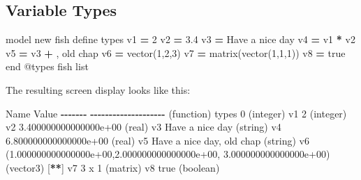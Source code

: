 \documentclass[a4paper, nobind]{templates/ociamthesis}
\newenvironment{Shaded}{\begin{snugshade}}{\end{snugshade}}
\newcommand{\AttributeTok}[1]{\textcolor[rgb]{0.77,0.63,0.00}{#1}}
\newcommand{\BuiltInTok}[1]{#1}
\newcommand{\DecValTok}[1]{\textcolor[rgb]{0.00,0.00,0.81}{#1}}
\newcommand{\FloatTok}[1]{\textcolor[rgb]{0.00,0.00,0.81}{#1}}
\newcommand{\NormalTok}[1]{#1}
\newcommand{\OperatorTok}[1]{\textcolor[rgb]{0.81,0.36,0.00}{\textbf{#1}}}
\newcommand{\StringTok}[1]{\textcolor[rgb]{0.31,0.60,0.02}{#1}}
\renewenvironment{Shaded}
{
  \vspace{10pt}%
  \begin{snugshade}%
}{%
  \end{snugshade}%
  \vspace{8pt}%
}
\begin{document}
\hypertarget{variable-types}{%
\subsection{Variable Types}\label{variable-types}}

\begin{Shaded}
\begin{Highlighting}[]
\NormalTok{model new}
\NormalTok{fish define types}
\NormalTok{    v1 }\OperatorTok{=} \DecValTok{2}
\NormalTok{    v2 }\OperatorTok{=} \FloatTok{3.4}
\NormalTok{    v3 }\OperatorTok{=} \StringTok{\textquotesingle{}Have a nice day\textquotesingle{}}
\NormalTok{    v4 }\OperatorTok{=}\NormalTok{ v1 }\OperatorTok{*}\NormalTok{ v2}
\NormalTok{    v5 }\OperatorTok{=}\NormalTok{ v3 }\OperatorTok{+} \StringTok{\textquotesingle{}, old chap\textquotesingle{}}
\NormalTok{    v6 }\OperatorTok{=}\NormalTok{ vector(}\DecValTok{1}\NormalTok{,}\DecValTok{2}\NormalTok{,}\DecValTok{3}\NormalTok{)}
\NormalTok{    v7 }\OperatorTok{=}\NormalTok{ matrix(vector(}\DecValTok{1}\NormalTok{,}\DecValTok{1}\NormalTok{,}\DecValTok{1}\NormalTok{))}
\NormalTok{    v8 }\OperatorTok{=}\NormalTok{ true}
\NormalTok{end}
\AttributeTok{@types}
\NormalTok{fish }\BuiltInTok{list}
\end{Highlighting}
\end{Shaded}

The resulting screen display looks like this:

\begin{Shaded}
\begin{Highlighting}[]
\NormalTok{           Name    Value}
           \OperatorTok{{-}{-}{-}{-}{-}{-}{-}} \OperatorTok{{-}{-}{-}{-}{-}{-}{-}{-}{-}{-}{-}{-}{-}{-}{-}{-}{-}{-}{-}{-}}
\NormalTok{(function) types }\DecValTok{0}\NormalTok{ (integer)}
\NormalTok{           v1    }\DecValTok{2}\NormalTok{ (integer)}
\NormalTok{           v2    }\FloatTok{3.400000000000000e+00}\NormalTok{ (real)}
\NormalTok{           v3    }\StringTok{\textquotesingle{}Have a nice day\textquotesingle{}}\NormalTok{ (string)}
\NormalTok{           v4    }\FloatTok{6.800000000000000e+00}\NormalTok{ (real)}
\NormalTok{           v5    }\StringTok{\textquotesingle{}Have a nice day, old chap\textquotesingle{}}\NormalTok{ (string)}
\NormalTok{           v6    (}\FloatTok{1.000000000000000e+00}\NormalTok{,}\FloatTok{2.000000000000000e+00}\NormalTok{,}
                  \FloatTok{3.000000000000000e+00}\NormalTok{) (vector3)                [}\OperatorTok{**}\NormalTok{]}
\NormalTok{           v7    }\DecValTok{3}\NormalTok{ x }\DecValTok{1}\NormalTok{ (matrix)}
\NormalTok{           v8    true (boolean)}
\end{Highlighting}
\end{Shaded}
\end{document}

